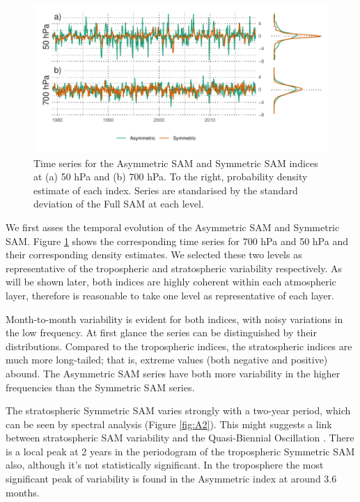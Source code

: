 \documentclass[smallextended]{svjour3}       %
\begin{document}
\begin{figure}
\includegraphics{asymsam-timeseries-1} \caption{Time series for the Asymmetric SAM and Symmetric SAM indices at (a) 50 hPa and (b) 700 hPa. To the right, probability density estimate of each index. Series are standarised by the standard deviation of the Full SAM at each level.}\label{fig:asymsam-timeseries}
\end{figure}

We first asses the temporal evolution of the Asymmetric SAM and Symmetric SAM. Figure \ref{fig:asymsam-timeseries} shows the corresponding time series for 700 hPa and 50 hPa and their corresponding density estimates. We selected these two levels as representative of the tropospheric and stratospheric variability respectively. As will be shown later, both indices are highly coherent within each atmospheric layer, therefore is reasonable to take one level as representative of each layer.

Month-to-month variability is evident for both indices, with noisy variations in the low frequency. At first glance the series can be distinguished by their distributions. Compared to the tropospheric indices, the stratospheric indices are much more long-tailed; that is, extreme values (both negative and positive) abound. The Asymmetric SAM series have both more variability in the higher frequencies than the Symmetric SAM series.

The stratospheric Symmetric SAM varies strongly with a two-year period, which can be seen by spectral analysis (Figure \ref{fig:A2}). This might suggests a link between stratospheric SAM variability and the Quasi-Biennial Oscillation \citep{baldwin2001b}. There is a local peak at 2 years in the periodogram of the tropospheric Symmetric SAM also, although it's not statistically significant. In the troposphere the most significant peak of variability is found in the Asymmetric index at around 3.6 months.
\end{document}
